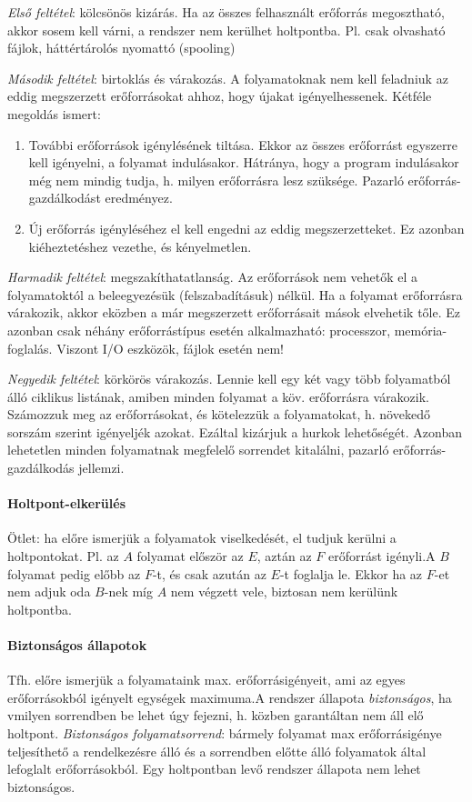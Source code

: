 \documentclass[fleqn,10pt,a4paper]{article}
\theoremstyle{magyar}
\begin{document}
  \emph{Első feltétel}: kölcsönös kizárás. Ha az összes felhasznált erőforrás megosztható, akkor sosem kell várni, a
  rendszer nem kerülhet holtpontba. Pl. csak olvasható fájlok, háttértárolós nyomattó (spooling)
  
  \emph{Második feltétel}: birtoklás és várakozás. A folyamatoknak nem kell feladniuk az eddig megszerzett erőforrásokat
  ahhoz, hogy újakat igényelhessenek. Kétféle megoldás ismert:
  \begin{enumerate}
  \item További erőforrások igénylésének tiltása. Ekkor az összes erőforrást egyszerre kell igényelni, a folyamat
    indulásakor. Hátránya, hogy a program indulásakor még nem mindig tudja, h. milyen erőforrásra lesz
    szüksége. Pazarló erőforrás-gazdálkodást eredményez.
  \item Új erőforrás igényléséhez el kell engedni az eddig megszerzetteket. Ez azonban kiéheztetéshez vezethe, és kényelmetlen.
  \end{enumerate}
  
  \emph{Harmadik feltétel}: megszakíthatatlanság. Az erőforrások nem vehetők el a folyamatoktól a beleegyezésük
  (felszabadításuk) nélkül. Ha a folyamat erőforrásra várakozik, akkor eközben a már megszerzett erőforrásait mások elvehetik tőle.
  Ez azonban csak néhány erőforrástípus esetén alkalmazható: processzor, memória-foglalás. Viszont I/O eszközök, fájlok
  esetén nem!
  
  \emph{Negyedik feltétel}: körkörös várakozás. Lennie kell egy két vagy több folyamatból álló ciklikus listának, amiben
  minden folyamat a köv. erőforrásra várakozik. Számozzuk meg az erőforrásokat, és kötelezzük a folyamatokat,
  h. növekedő sorszám szerint igényeljék azokat. Ezáltal kizárjuk a hurkok lehetőségét. Azonban lehetetlen minden
  folyamatnak megfelelő sorrendet kitalálni, pazarló erőforrás-gazdálkodás jellemzi.

  
  \paragraph{Holtpont-elkerülés} Ötlet: ha előre ismerjük a folyamatok viselkedését, el tudjuk kerülni a holtpontokat. Pl.
  az $A$ folyamat először az $E$, aztán az $F$ erőforrást igényli.A  $B$ folyamat pedig előbb az $F$-t, és csak azután az
  $E$-t foglalja le. Ekkor ha az $F$-et nem adjuk oda $B$-nek míg $A$ nem végzett vele, biztosan nem kerülünk
  holtpontba.
  
  \paragraph{Biztonságos állapotok}
  Tfh. előre ismerjük a folyamataink max. erőforrásigényeit, ami az egyes erőforrásokból igényelt egységek maximuma.A
  rendszer állapota \emph{biztonságos}, ha vmilyen sorrendben be lehet úgy fejezni, h. közben garantáltan nem áll elő
  holtpont. \emph{Biztonságos folyamatsorrend}: bármely folyamat max erőforrásigénye teljesíthető a rendelkezésre álló és a
  sorrendben előtte álló folyamatok által lefoglalt erőforrásokból. Egy holtpontban levő rendszer állapota nem lehet biztonságos.
  
\end{document}
